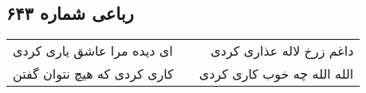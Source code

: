 \begin{center}
\section*{رباعی شماره ۶۴۳}
\label{sec:sh643}
\begin{longtable}{l p{0.5cm} r}
ای دیده مرا عاشق یاری کردی
&&
داغم زرخ لاله عذاری کردی
\\
کاری کردی که هیچ نتوان گفتن
&&
الله الله چه خوب کاری کردی
\\
\end{longtable}
\end{center}
